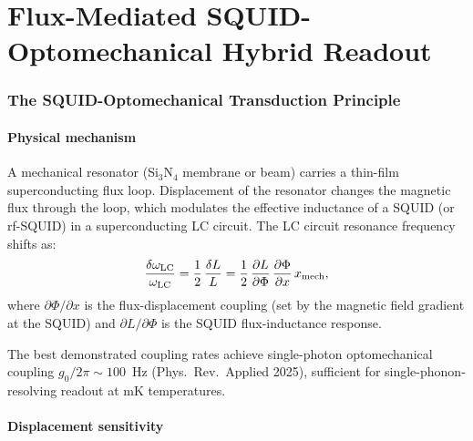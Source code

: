 \documentclass[11pt]{article}
\theoremstyle{definition}
\theoremstyle{remark}
\begin{document}
\part{Flux-Mediated SQUID-Optomechanical Hybrid Readout}
\label{part:SQUID_opto}


\section{The SQUID-Optomechanical Transduction Principle}
\label{sec:SQUID_opto}

\subsection{Physical mechanism}

A mechanical resonator (Si$_3$N$_4$ membrane or beam) carries a
thin-film superconducting flux loop. Displacement of the resonator
changes the magnetic flux through the loop, which modulates the
effective inductance of a SQUID (or rf-SQUID) in a superconducting
LC circuit. The LC circuit resonance frequency shifts as:
\begin{equation}
\frac{\delta\omega_{\rm LC}}{\omega_{\rm LC}}
= \frac{1}{2}\,\frac{\delta L}{L}
= \frac{1}{2}\,\frac{\partial L}{\partial\Phi}\,
\frac{\partial\Phi}{\partial x}\,x_{\rm mech},
\label{eq:SQUID_transduction}
\end{equation}
where $\partial\Phi/\partial x$ is the flux-displacement coupling
(set by the magnetic field gradient at the SQUID) and $\partial L/
\partial\Phi$ is the SQUID flux-inductance response.

The best demonstrated coupling rates achieve single-photon
optomechanical coupling $g_0/2\pi \sim 100$~Hz (Phys.\ Rev.\
Applied 2025), sufficient for single-phonon-resolving readout at
mK temperatures.

\subsection{Displacement sensitivity}
\end{document}

